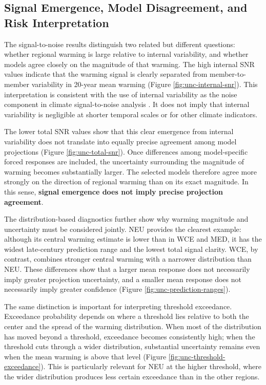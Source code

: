 \documentclass[
]{krantz}
\begin{document}
\subsection{Signal Emergence, Model Disagreement, and Risk Interpretation}\label{signal-emergence-model-disagreement-and-risk-interpretation}

The signal-to-noise results distinguish two related but different questions: whether regional warming is large relative to internal variability, and whether models agree closely on the magnitude of that warming. The high internal SNR values indicate that the warming signal is clearly separated from member-to-member variability in 20-year mean warming (Figure \ref{fig:unc-internal-snr}). This interpretation is consistent with the use of internal variability as the noise component in climate signal-to-noise analysis \citep{Hawkins2009, Gruber2026}. It does not imply that internal variability is negligible at shorter temporal scales or for other climate indicators.

The lower total SNR values show that this clear emergence from internal variability does not translate into equally precise agreement among model projections (Figure \ref{fig:unc-total-snr}). Once differences among model-specific forced responses are included, the uncertainty surrounding the magnitude of warming becomes substantially larger. The selected models therefore agree more strongly on the direction of regional warming than on its exact magnitude. In this sense, \textbf{signal emergence does not imply precise projection agreement}.

The distribution-based diagnostics further show why warming magnitude and uncertainty must be considered jointly. NEU provides the clearest example: although its central warming estimate is lower than in WCE and MED, it has the widest late-century prediction range and the lowest total signal clarity. WCE, by contrast, combines stronger central warming with a narrower distribution than NEU. These differences show that a larger mean response does not necessarily imply greater projection uncertainty, and a smaller mean response does not necessarily imply greater confidence (Figure \ref{fig:unc-prediction-ranges}).

The same distinction is important for interpreting threshold exceedance. Exceedance probability depends on where a threshold lies relative to both the center and the spread of the warming distribution. When most of the distribution has moved beyond a threshold, exceedance becomes consistently high; when the threshold cuts through a wider distribution, substantial uncertainty remains even when the mean warming is above that level (Figure \ref{fig:unc-threshold-exceedance}). This is particularly relevant for NEU at the higher threshold, where the wider distribution produces less certain exceedance than in the other regions.
\end{document}
